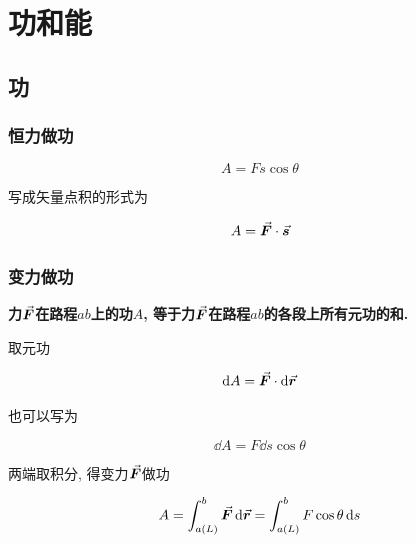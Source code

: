 \chapter{功和能}

\begin{introduction}
	\item {}
	\item {}
	\item {}
	\item {}
	\item {}
	\item {}
\end{introduction}

\section{功} \label{3.1}

\subsection{恒力做功}

\begin{equation}
	A = Fs \cos \theta \label{C3-eq1}
\end{equation}

写成矢量点积的形式为

\begin{equation}
	A = \va*{F} \cdot \va*{s} \label{C3-eq2}
\end{equation}

\subsection{变力做功}

\textbf{力$\va*{F}$在路程$ab$上的功$A$, 等于力$\va*{F}$在路程$ab$的各段上所有元功的和. }

取元功

\begin{equation*}
	\dd{A} = \va*{F} \cdot \dd{\va*{r}} 
\end{equation*}

也可以写为

\begin{equation*}
	\dd{A} = F \dd{s} \cos \theta
\end{equation*} 

两端取积分, 得变力$\va*{F}$做功

\begin{equation}
	A = \int_{a(L)}^{b} \va*{F} \dd{\va*{r}} = \int_{a(L)}^{b} F \cos \theta \dd{s} \label{C3-eq3}
\end{equation}

